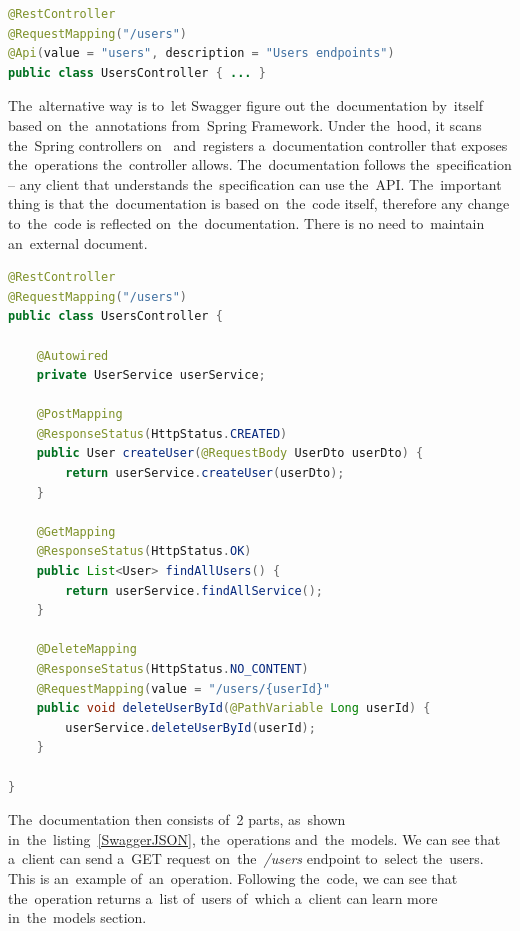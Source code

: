 \vspace{2mm}
\begin{lstlisting}[caption=An~example of~Swagger's internal annotation that can
be used to~generate documentation., language=Java,
label=SwaggerAnnotation]
@RestController
@RequestMapping("/users")
@Api(value = "users", description = "Users endpoints")
public class UsersController { ... }
\end{lstlisting}

The~alternative way is to~let Swagger figure out the~documentation by~itself
based on~the~annotations from~Spring Framework. Under the~hood, it scans
the~Spring controllers on~ and~registers a~documentation controller that exposes the~operations
the~controller allows. The~documentation follows the~specification -- any client
that understands the~specification can use the~API. The~important thing is that
the~documentation is based on~the~code itself, therefore any change to~the~code
is reflected on~the~documentation. There is no need to~maintain an~external
document. 

\vspace{2mm}
\begin{lstlisting}[caption=An~example of~Spring MVC controller that can be used
by~Swagger to~generate API documentation., language=Java,
label=SpringController]
@RestController
@RequestMapping("/users")
public class UsersController {
	
	@Autowired
	private UserService userService;
	
	@PostMapping
	@ResponseStatus(HttpStatus.CREATED)
	public User createUser(@RequestBody UserDto userDto) {
		return userService.createUser(userDto);
	}
	
	@GetMapping
	@ResponseStatus(HttpStatus.OK)
	public List<User> findAllUsers() {
		return userService.findAllService();
	}
	
	@DeleteMapping
	@ResponseStatus(HttpStatus.NO_CONTENT)
	@RequestMapping(value = "/users/{userId}"
	public void deleteUserById(@PathVariable Long userId) {
		userService.deleteUserById(userId);
	}
	
}
\end{lstlisting}

The~documentation then consists of~2 parts, as~shown
in~the~listing~\ref{SwaggerJSON}, the~operations and~the~models. We can
see that a~client can send a~GET request on~the~\textit{/users} endpoint
to~select the~users. This is an~example of~an~operation. Following the~code, we can see that the~operation returns
a~list of~users of~which a~client can learn more in~the~models section.

